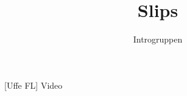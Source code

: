 \documentclass[danish]{article}
\title{Slips}
\author{Introgruppen}
\begin{document}
\maketitle

\begin{roles}
  [Uffe FL] Video
\end {roles} 

\begin{props}
\end{props}
\end{document}
